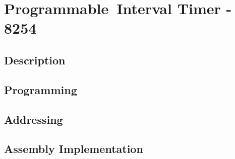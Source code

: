 \newpage
\section{Programmable Interval Timer - 8254}

    \subsection{Description}

    \subsection{Programming}

    \subsection{Addressing}

    \subsection{Assembly Implementation}
